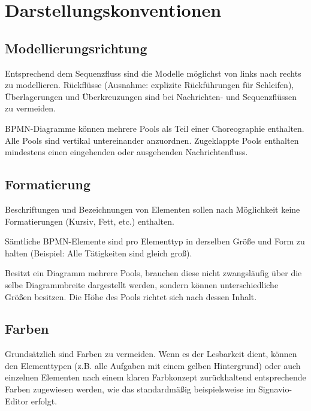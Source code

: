 \documentclass[12pt,report]{../../Templates/snetTeaching}
\begin{document}
\section{Darstellungskonventionen}

\subsection{Modellierungsrichtung}

Entsprechend dem Sequenzfluss sind die Modelle möglichst von links nach rechts zu modellieren. Rückflüsse (Ausnahme: explizite Rückführungen für Schleifen), Überlagerungen und Überkreuzungen sind bei Nachrichten- und Sequenzflüssen zu vermeiden.

BPMN-Diagramme können mehrere Pools als Teil einer Choreographie enthalten. Alle Pools sind vertikal untereinander anzuordnen. Zugeklappte Pools enthalten mindestens einen eingehenden oder ausgehenden Nachrichtenfluss.

\subsection{Formatierung}

Beschriftungen und Bezeichnungen von Elementen sollen nach Möglichkeit keine Formatierungen (Kursiv, Fett, etc.) enthalten.

Sämtliche BPMN-Elemente sind pro Elementtyp in derselben Größe und Form zu halten (Beispiel: Alle Tätigkeiten sind gleich groß).

Besitzt ein Diagramm mehrere Pools, brauchen diese nicht zwangsläufig über die selbe Diagrammbreite dargestellt werden, sondern können unterschiedliche Größen besitzen. Die Höhe des Pools richtet sich nach dessen Inhalt.

\subsection{Farben}
Grundsätzlich sind Farben zu vermeiden. Wenn es der Lesbarkeit dient, können den Elementtypen (z.B. alle Aufgaben mit einem gelben Hintergrund) oder auch einzelnen Elementen nach einem klaren Farbkonzept zurückhaltend entsprechende Farben zugewiesen werden, wie das standardmäßig beispielsweise im Signavio-Editor erfolgt.


\begin{Rahmen}
	\\
\end{Rahmen}
\end{document}
